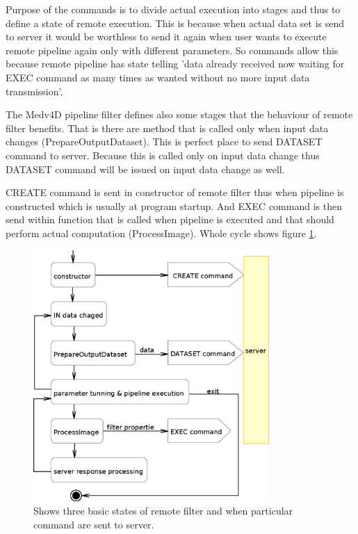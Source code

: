 \par
Purpose of the commands is to divide actual execution into stages and thus to define a state of remote execution.
This is because when actual data set is send to server it would be worthless to send it again when user wants to execute remote pipeline again only with different parameters.
So commands allow this because remote pipeline has state telling 'data already received now waiting for EXEC command as many times as wanted without no more input data transmission'.
\par
The Medv4D pipeline filter defines also some stages that the behaviour of remote filter benefits.
That is there are method that is called only when input data changes (PrepareOutputDataset).
This is perfect place to send DATASET command to server.
Because this is called only on input data change thus DATASET command will be issued on input data change as well.
\par
CREATE command is sent in constructor of remote filter thus when pipeline is constructed which is usually at program startup.
And EXEC command is then send within function that is called when pipeline is executed and that should perform actual computation (ProcessImage).
Whole cycle shows figure \ref{fg:RCClientCycle}.

\begin{figure}
    \centering
    \includegraphics[width=0.8\textwidth]{data/RCClientCycle}
    \caption[Remote Medv4D filter]{Shows three basic states of remote filter and when particular command are sent to server.}
    \label{fg:RCClientCycle}
\end{figure}

